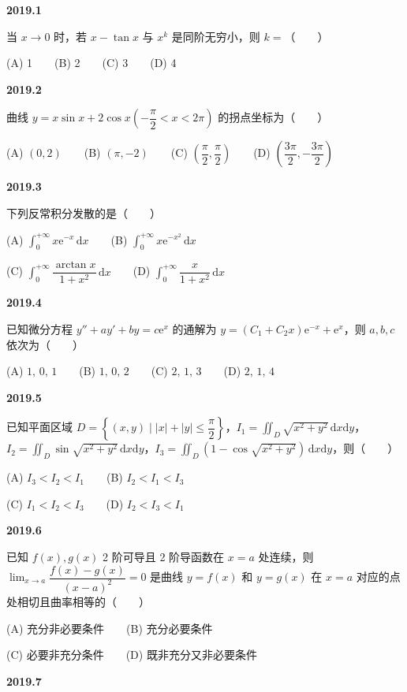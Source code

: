 \documentclass[UTF8,12pt,fontset=windows]{ctexart}
\begin{document}
{\large\bfseries 2019.1}

当 $x \to 0$ 时，若 $x - \tan x$ 与 $x^k$ 是同阶无穷小，则 $k =$（　　）

(A) 1　　(B) 2　　(C) 3　　(D) 4

\vfill
\newpage
{\large\bfseries 2019.2}

曲线 $y = x\sin x + 2\cos x \left(-\dfrac{\pi}{2} < x < 2\pi\right)$ 的拐点坐标为（　　）

(A) $(0, 2)$　　(B) $(\pi, -2)$　　(C) $\left(\dfrac{\pi}{2}, \dfrac{\pi}{2}\right)$　　(D) $\left(\dfrac{3\pi}{2}, -\dfrac{3\pi}{2}\right)$

\vfill
\newpage
{\large\bfseries 2019.3}

下列反常积分发散的是（　　）

(A) $\int_{0}^{+\infty} x\mathrm{e}^{-x}\,\mathrm{d}x$　　(B) $\int_{0}^{+\infty} x\mathrm{e}^{-x^2}\,\mathrm{d}x$

(C) $\int_{0}^{+\infty} \dfrac{\arctan x}{1+x^2}\,\mathrm{d}x$　　(D) $\int_{0}^{+\infty} \dfrac{x}{1+x^2}\,\mathrm{d}x$

\vfill
\newpage
{\large\bfseries 2019.4}

已知微分方程 $y'' + ay' + by = c\mathrm{e}^x$ 的通解为 $y = (C_1 + C_2 x)\mathrm{e}^{-x} + \mathrm{e}^x$，则 $a, b, c$ 依次为（　　）

(A) $1,\, 0,\, 1$　　(B) $1,\, 0,\, 2$　　(C) $2,\, 1,\, 3$　　(D) $2,\, 1,\, 4$

\vfill
\newpage
{\large\bfseries 2019.5}

已知平面区域 $D = \left\{(x,y) \mid |x| + |y| \leqslant \dfrac{\pi}{2}\right\}$，$I_1 = \iint_D \sqrt{x^2+y^2}\,\mathrm{d}x\mathrm{d}y$，$I_2 = \iint_D \sin\sqrt{x^2+y^2}\,\mathrm{d}x\mathrm{d}y$，$I_3 = \iint_D (1-\cos\sqrt{x^2+y^2})\,\mathrm{d}x\mathrm{d}y$，则（　　）

(A) $I_3 < I_2 < I_1$　　(B) $I_2 < I_1 < I_3$

(C) $I_1 < I_2 < I_3$　　(D) $I_2 < I_3 < I_1$

\vfill
\newpage
{\large\bfseries 2019.6}

已知 $f(x), g(x)$ 2 阶可导且 2 阶导函数在 $x = a$ 处连续，则 $\lim_{x\to a} \dfrac{f(x) - g(x)}{(x-a)^2} = 0$ 是曲线 $y = f(x)$ 和 $y = g(x)$ 在 $x = a$ 对应的点处相切且曲率相等的（　　）

(A) 充分非必要条件　　(B) 充分必要条件

(C) 必要非充分条件　　(D) 既非充分又非必要条件

\vfill
\newpage
{\large\bfseries 2019.7}
\end{document}
